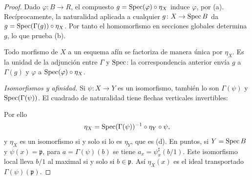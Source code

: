 \begin{proof}
Dado $\varphi\colon B\to R$, el compuesto $g=\operatorname{Spec}(\varphi)\circ\eta_X$ induce $\varphi$, por (a). Recíprocamente, la naturalidad aplicada a cualquier $g\colon X\to\operatorname{Spec} B$ da $g=\operatorname{Spec}(\Gamma(g))\circ\eta_X$. Por tanto el homomorfismo en secciones globales determina $g$, lo que prueba (b).
\begin{center}
\begin{minipage}{.47\textwidth}
\centering
{}
\end{minipage}\hfill
\begin{minipage}{.49\textwidth}
\centering
{}
\end{minipage}
\end{center}
Todo morfismo de $X$ a un esquema afín se factoriza de manera única por $\eta_X$. Es la unidad de la adjunción entre $\Gamma$ y $\operatorname{Spec}$: la correspondencia anterior envía $g$ a $\Gamma(g)$ y $\varphi$ a $\operatorname{Spec}(\varphi)\circ\eta_X$.

\emph{Isomorfismos y afinidad.} Si $\psi\colon X\to Y$ es un isomorfismo, también lo son $\Gamma(\psi)$ y $\operatorname{Spec}(\Gamma(\psi))$. El cuadrado de naturalidad tiene flechas verticales invertibles:
\begin{center}
\end{center}
Por ello
\[
\eta_X=\operatorname{Spec}(\Gamma(\psi))^{-1}\circ\eta_Y\circ\psi,
\]
y $\eta_X$ es un isomorfismo si y solo si lo es $\eta_Y$, que es (d). En puntos, si $Y=\operatorname{Spec} B$ y $\psi(x)=\mathfrak p$, para $a=\Gamma(\psi)(b)$ se tiene $a_x=\psi_x^\sharp(b/1)$. Este isomorfismo local lleva $b/1$ al maximal si y solo si $b\in\mathfrak p$. Así $\eta_X(x)$ es el ideal transportado $\Gamma(\psi)(\mathfrak p)$.


\end{proof}
